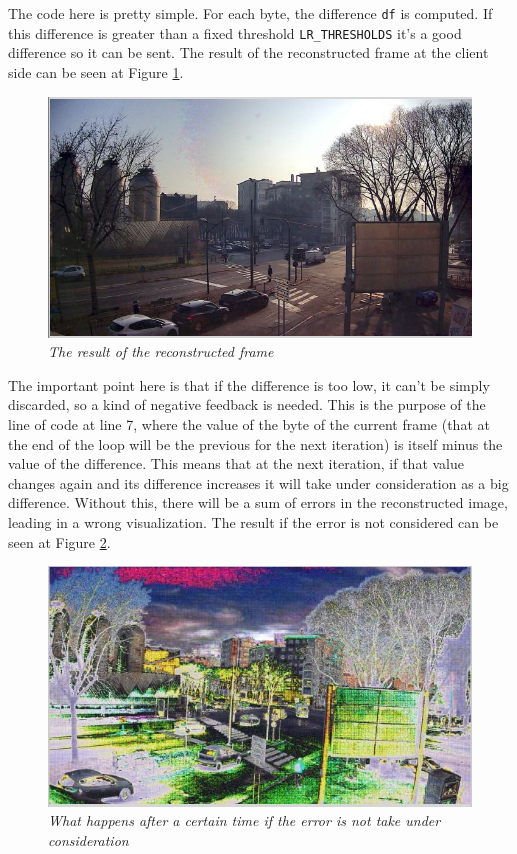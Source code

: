 \documentclass[paper=a4, fontsize=10pt]{scrartcl}	%
\begin{document}
	The code here is pretty simple. For each byte, the difference \texttt{df} is computed. If this difference is greater than a fixed threshold \texttt{LR\_THRESHOLDS} it's a good difference so it can be sent. The result of the reconstructed frame at the client side can be seen at Figure \ref{fig:stream_ok}.\\

	\begin{figure}[H]
		\centering
		\includegraphics[width=0.7\linewidth]{images/streaming_ok2.png}
		\caption{\textit{The result of the reconstructed frame}}
		\label{fig:stream_ok}
	\end{figure}
	
	The important point here is that if the difference is too low, it can't be simply discarded, so a kind of negative feedback is needed. This is the purpose of the line of code at line 7, where the value of the byte of the current frame (that at the end of the loop will be the previous for the next iteration) is itself minus the value of the difference. This means that at the next iteration, if that value changes again and its difference increases it will take under consideration as a big difference. Without this, there will be a sum of errors in the reconstructed image, leading in a wrong visualization. The result if the error is not considered can be seen at Figure \ref{fig:stream_error}.
	
	\begin{figure}[H]
		\centering
		\includegraphics[width=0.7\linewidth]{images/streaming_differror.png}
		\caption{\textit{What happens after a certain time if the error is not take under consideration}}
		\label{fig:stream_error}
	\end{figure}
\end{document}
